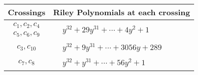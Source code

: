 \documentclass[1p]{elsarticle_modified}
\theoremstyle{definition}
\begin{document}
\begin{tabular}{m{50pt}|m{274pt}}
Crossings & \hspace{64pt}Riley Polynomials at each crossing \\
\hline $$\begin{aligned}c_{1},c_{2},c_{4}\\c_{5},c_{6},c_{9}\end{aligned}$$&$\begin{aligned}
&y^{32}+29 y^{31}+\cdots+4 y^2+1
\end{aligned}$\\
\hline $$\begin{aligned}c_{3},c_{10}\end{aligned}$$&$\begin{aligned}
&y^{32}+9 y^{31}+\cdots+3056 y+289
\end{aligned}$\\
\hline $$\begin{aligned}c_{7},c_{8}\end{aligned}$$&$\begin{aligned}
&y^{32}+y^{31}+\cdots+56 y^2+1
\end{aligned}$\\
\hline
\end{tabular}
\vskip 2pc
\end{document}
